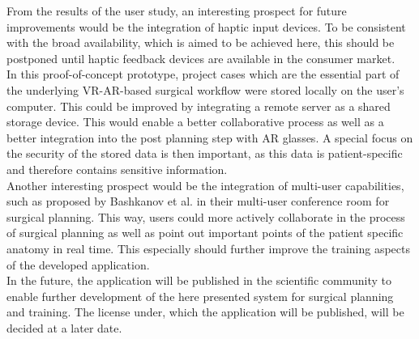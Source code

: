 From the results of the user study, an interesting prospect for
future improvements would be the integration of 
haptic input devices. 
To be consistent with the broad availability, which is
aimed to be achieved here, this should be postponed
until haptic feedback devices are available
in the consumer market. 
\\ In this proof-of-concept prototype, project
cases which are the essential part of the underlying VR-AR-based
surgical workflow were stored locally on the user's 
computer. This could be improved by integrating a remote server as 
a shared storage device. 
This would enable a better collaborative process as well as a 
better integration into the post planning step with AR glasses.
A special focus on the security of the stored data is then 
important, as this data is patient-specific and therefore 
contains sensitive information.
\\ Another interesting prospect would be the integration of multi-user
capabilities, such as proposed by Bashkanov et al. \cite{RN43} in their
multi-user conference room for surgical planning. 
This way, users could more actively collaborate in the process 
of surgical planning as well as point out 
important points of the patient specific anatomy in real time.
This especially should further improve the training aspects of 
the developed application. 
\\ In the future, the application will be published in the scientific community to enable further development of the here presented system for surgical planning and training.
The license under, which the application will be published, will be decided at a later date.